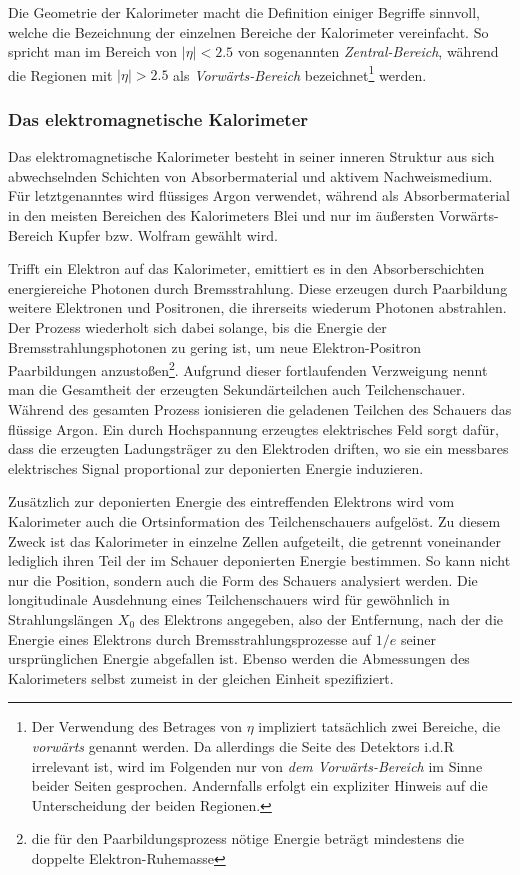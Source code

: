 Die Geometrie der Kalorimeter macht die Definition einiger Begriffe sinnvoll,
welche die Bezeichnung der einzelnen Bereiche der Kalorimeter vereinfacht. So
spricht man im Bereich von $|\eta|<2.5$ von sogenannten \emph{Zentral-Bereich},
während die Regionen mit $|\eta| > 2.5$ als \emph{Vorwärts-Bereich}
bezeichnet\footnote{Der Verwendung des Betrages von $\eta$ impliziert
tatsächlich zwei Bereiche, die \textit{vorwärts} genannt werden. Da allerdings
die Seite des Detektors i.d.R irrelevant ist, wird im Folgenden nur von 
\textit{dem Vorwärts-Bereich} im Sinne beider Seiten gesprochen. Andernfalls
erfolgt ein expliziter Hinweis auf die Unterscheidung der beiden Regionen.}
werden.

\subsubsection{Das elektromagnetische Kalorimeter}
Das elektromagnetische Kalorimeter besteht in seiner inneren Struktur aus sich
abwechselnden Schichten von Absorbermaterial und aktivem Nachweismedium. Für
letztgenanntes wird flüssiges Argon verwendet, während als Absorbermaterial in
den meisten Bereichen des Kalorimeters Blei und nur im äußersten
Vorwärts-Bereich Kupfer bzw. Wolfram gewählt wird.

Trifft ein Elektron auf das Kalorimeter, emittiert es in den Absorberschichten
energiereiche Photonen durch Bremsstrahlung. Diese erzeugen durch Paarbildung
weitere Elektronen und Positronen, die ihrerseits wiederum Photonen abstrahlen.
Der Prozess wiederholt sich dabei solange, bis die Energie der
Bremsstrahlungsphotonen zu gering ist, um neue Elektron-Positron Paarbildungen
anzustoßen\footnote{die für den Paarbildungsprozess nötige Energie beträgt
mindestens die doppelte Elektron-Ruhemasse}. Aufgrund dieser fortlaufenden
Verzweigung nennt man die Gesamtheit der erzeugten Sekundärteilchen auch
Teilchenschauer. Während des gesamten Prozess ionisieren die geladenen Teilchen
des Schauers das flüssige Argon. Ein durch Hochspannung erzeugtes elektrisches
Feld sorgt dafür, dass die erzeugten Ladungsträger zu den Elektroden driften,
wo sie ein messbares elektrisches Signal proportional zur deponierten Energie
induzieren.

Zusätzlich zur deponierten Energie des eintreffenden Elektrons wird vom
Kalorimeter auch die Ortsinformation des Teilchenschauers aufgelöst. Zu diesem
Zweck ist das Kalorimeter in einzelne Zellen aufgeteilt, die getrennt
voneinander lediglich ihren Teil der im Schauer deponierten Energie bestimmen.
So kann nicht nur die Position, sondern auch die Form des Schauers analysiert
werden. Die longitudinale Ausdehnung eines Teilchenschauers wird für gewöhnlich
in Strahlungslängen $X_0$ des Elektrons angegeben, also der Entfernung, nach
der die Energie eines Elektrons durch Bremsstrahlungsprozesse auf $1/e$ seiner
ursprünglichen Energie abgefallen ist. Ebenso werden die Abmessungen des
Kalorimeters selbst zumeist in der gleichen Einheit spezifiziert.

